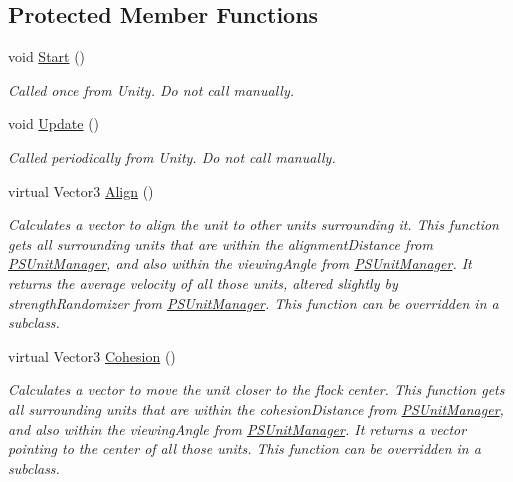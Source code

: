 \subsection*{Protected Member Functions}
\begin{DoxyCompactItemize}
\item 
\mbox{\label{class_p_s_flocking_1_1_p_s_flocking_unit_ac839f13af6962f86198dd14bf8e2495b}} 
void \hyperlink{class_p_s_flocking_1_1_p_s_flocking_unit_ac839f13af6962f86198dd14bf8e2495b}{Start} ()
\begin{DoxyCompactList}\small\item\em Called once from Unity. Do not call manually. \end{DoxyCompactList}\item 
\mbox{\label{class_p_s_flocking_1_1_p_s_flocking_unit_a4bfe16a5cf81ba127fc76597cb86623a}} 
void \hyperlink{class_p_s_flocking_1_1_p_s_flocking_unit_a4bfe16a5cf81ba127fc76597cb86623a}{Update} ()
\begin{DoxyCompactList}\small\item\em Called periodically from Unity. Do not call manually. \end{DoxyCompactList}\item 
virtual Vector3 \hyperlink{class_p_s_flocking_1_1_p_s_flocking_unit_ada3fa9e23f12a1b8258dc324f5b3e511}{Align} ()
\begin{DoxyCompactList}\small\item\em Calculates a vector to align the unit to other units surrounding it. This function gets all surrounding units that are within the alignment\+Distance from \hyperlink{class_p_s_flocking_1_1_p_s_unit_manager}{P\+S\+Unit\+Manager}, and also within the viewing\+Angle from \hyperlink{class_p_s_flocking_1_1_p_s_unit_manager}{P\+S\+Unit\+Manager}. It returns the average velocity of all those units, altered slightly by strength\+Randomizer from \hyperlink{class_p_s_flocking_1_1_p_s_unit_manager}{P\+S\+Unit\+Manager}. This function can be overridden in a subclass. \end{DoxyCompactList}\item 
virtual Vector3 \hyperlink{class_p_s_flocking_1_1_p_s_flocking_unit_a87ad210603e8d8451e14a4de8af9cba0}{Cohesion} ()
\begin{DoxyCompactList}\small\item\em Calculates a vector to move the unit closer to the flock center. This function gets all surrounding units that are within the cohesion\+Distance from \hyperlink{class_p_s_flocking_1_1_p_s_unit_manager}{P\+S\+Unit\+Manager}, and also within the viewing\+Angle from \hyperlink{class_p_s_flocking_1_1_p_s_unit_manager}{P\+S\+Unit\+Manager}. It returns a vector pointing to the center of all those units. This function can be overridden in a subclass. \end{DoxyCompactList}\item 

\end{DoxyCompactItemize}
